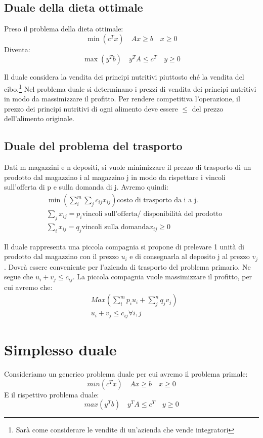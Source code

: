 \subsection{Duale della dieta ottimale}
Preso il problema della dieta ottimale: 
\[\min(c^Tx) \quad Ax \geq b \quad x \geq 0\] 
Diventa: 
\[\max(y^Tb) \quad y^TA \leq c^T \quad y \geq 0\]

Il duale considera la vendita dei principi nutritivi piuttosto ché la vendita del cibo.\footnote{Sarà come considerare le vendite di un'azienda che vende integratori}
Nel problema duale si determinano i prezzi di vendita dei principi nutritivi in modo da massimizzare il profitto. Per rendere competitiva l'operazione, il prezzo dei principi nutritivi di ogni alimento deve essere $\leq$ del prezzo dell'alimento originale.

\subsection{Duale del problema del trasporto}
Dati m magazzini e n depositi, si vuole minimizzare il prezzo di trasporto di un prodotto dal magazzino i al magazzino j in modo da rispettare i vincoli sull'offerta di p e sulla domanda di j. Avremo quindi:
\begin{align*}
    &\min (\sum_i^m \sum_j c_{ij} x_{ij}) \text{costo di trasporto da i a j.}\\
    &\sum_j x_{ij} = p_i \text{vincoli sull'offerta/ disponibilità del prodotto}\\
    &\sum_i x_{ij} = q_j \text{vincoli sulla domanda}
    x_{ij} \geq 0 
\end{align*}

Il duale rappresenta una piccola compagnia si propone di prelevare 1 unità di prodotto dal magazzino con il prezzo $u_i$ e di consegnarla al deposito j al prezzo $v_j$.
Dovrà essere conveniente per l'azienda di trasporto del problema primario. Ne segue che $u_i+v_j \leq c_{ij}$.
La piccola compagnia vuole massimizzare il profitto, per cui avremo che:
\begin{align*}
    &Max(\sum_i^m p_iu_i+\sum_j^n q_jv_j)\\
    &u_i+v_j \leq c_{ij} \forall i, j
\end{align*}

\section{Simplesso duale}
Consideriamo un generico problema duale per cui avremo il problema primale:
\[min(c^Tx) \quad Ax \geq b \quad x \geq 0\]  
E il rispettivo problema duale:
\[max(y^Tb) \quad y^TA\leq c^T \quad y \geq 0\] 

